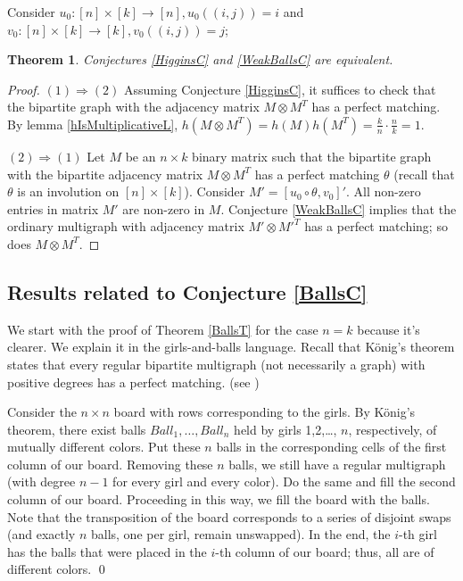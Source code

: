 \documentclass[12pt]{article}
\newtheorem{theorem}{Theorem}
\theoremstyle{definition}
\theoremstyle{plain}
\begin{document}
Consider $u_0:[n]\times[k] \rightarrow [n], u_0((i,j))=i$ and $v_0 : [n] \times[k] \rightarrow [k], v_0((i,j))=j$; 

\begin {theorem} \label{WeakBallsAndHigginsAreEquiv}
  Conjectures \ref{HigginsC} and \ref{WeakBallsC} are equivalent.
\end {theorem}

\begin {proof}

$(1) \Rightarrow (2)$ Assuming Conjecture \ref{HigginsC}, it suffices to check that the bipartite graph with the adjacency matrix $M \otimes M^T$ has a perfect matching. By lemma \ref {hIsMultiplicativeL}, $h(M \otimes M^T) = h(M)h(M^T) = \frac{k}{n} \cdot \frac{n}{k} = 1$.

$(2) \Rightarrow (1)$
 Let $M$ be an $n \times k$ binary matrix such that the bipartite graph with the bipartite adjacency matrix $M \otimes M^T$ has a perfect matching $\theta$ (recall that $\theta$ is an involution on $[n] \times [k]$). Consider $M' = [u_0 \circ \theta, v_0]'$. All non-zero entries in matrix $M'$ are non-zero in $M$. Conjecture \ref{WeakBallsC} implies that the ordinary multigraph with adjacency matrix $M' \otimes M'^T$ has a perfect matching; so does $M \otimes M^T$.

\end {proof}

\subsection{Results related to Conjecture \ref{BallsC}}

We start with the proof of Theorem \ref{BallsT} for the case $n=k$ because it's clearer. We explain it in the girls-and-balls language. Recall that K\"onig's theorem states that every regular bipartite multigraph (not necessarily a graph) with positive degrees has a perfect matching. (see \cite{K})

Consider the $n\times n$ board with rows corresponding to the girls.
By K\"onig's theorem, there exist balls
$Ball_1,\ldots,Ball_n$ held by girls 1,2,\ldots, $n$, respectively, of mutually different colors. Put these $n$ balls in the corresponding cells of
the first column of our board. Removing these $n$ balls, we still have a regular
multigraph (with degree $n-1$ for every girl and every color). Do the same and fill
the second column of our board. Proceeding in this way, we fill the board with the balls. Note that the transposition of the board corresponds to a series of disjoint swaps (and exactly $n$ balls, one per girl, remain unswapped). In the end, the $i$-th girl has the balls that were placed in the $i$-th column of our board; thus, all are of different colors. 
\qed
\end{document}
